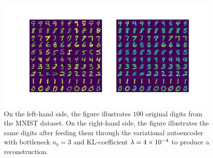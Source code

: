 \begin{figure}
\begin{center}
      \includegraphics[trim = 15mm 10mm 15mm 15mm, clip, width=\linewidth]{convolutional_VAE_snd_KL_4e-4_5k_epochs_3D_inference}
\end{center}
\caption{On the left-hand side, the figure illustrates $100$ original digits from the MNIST dataset. On the right-hand side, the figure illustrates the same digits after feeding them through the variational autoencoder with bottleneck $n_b=3$ and KL-coefficient $\lambda=\num{4e-4}$ to produce a reconstruction.}\label{fig:convolutional_VAE_snd_KL_4e-4_5k_epochs_3D_inference}
\end{figure}


